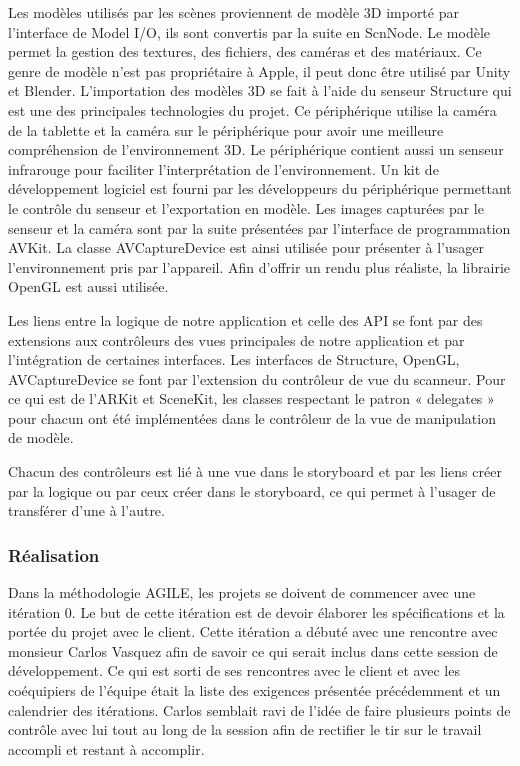 \documentclass[rapport.tex]{subfiles}
\begin{document}
\par
Les modèles utilisés par les scènes proviennent de modèle 3D importé par l’interface de Model I/O, ils sont convertis par la suite en ScnNode. Le modèle permet la gestion des textures, des fichiers, des caméras et des matériaux.\citep*{modelIODoc} Ce genre de modèle n’est pas propriétaire à Apple, il peut donc être utilisé par Unity\citep*{unityDoc} et Blender\citep*{blenderForumsRichardMarklew}.
L’importation des modèles 3D se fait à l’aide du senseur Structure qui est une des principales technologies du projet. Ce périphérique utilise la caméra de la tablette et la caméra sur le périphérique pour avoir une meilleure compréhension de l’environnement 3D. Le périphérique contient aussi un senseur infrarouge pour faciliter l’interprétation de l’environnement. Un kit de développement logiciel est fourni par les développeurs du périphérique permettant le contrôle du senseur et l’exportation en modèle.\citep{occipitalsdk} Les images capturées par le senseur et la caméra sont par la suite présentées par l’interface de programmation AVKit. La classe AVCaptureDevice est ainsi utilisée pour présenter à l’usager l’environnement pris par l’appareil.\citep*{aVKitDoc} Afin d’offrir un rendu plus réaliste, la librairie OpenGL est aussi utilisée.\citep*{openGLESDoc}
\par
Les liens entre la logique de notre application et celle des API se font par des extensions aux contrôleurs des vues principales de notre application et par l’intégration de certaines interfaces. Les interfaces de Structure, OpenGL, AVCaptureDevice se font par l’extension du contrôleur de vue du scanneur. Pour ce qui est de l’ARKit et SceneKit, les classes respectant le patron « delegates » pour chacun ont été implémentées dans le contrôleur de la vue de manipulation de modèle.
\par
Chacun des contrôleurs est lié à une vue dans le storyboard et par les liens créer par la logique ou par ceux créer dans le storyboard, ce qui permet à l’usager de transférer d’une à l’autre.
\subsubsection*{Réalisation}
Dans la méthodologie AGILE, les projets se doivent de commencer avec une itération 0. Le but de cette itération est de devoir élaborer les spécifications et la portée du projet avec le client. Cette itération a débuté avec une rencontre avec monsieur Carlos Vasquez afin de savoir ce qui serait inclus dans cette session de développement. Ce qui est sorti de ses rencontres avec le client et avec les coéquipiers de l’équipe était la liste des exigences présentée précédemment et un calendrier des itérations. Carlos semblait ravi de l’idée de faire plusieurs points de contrôle avec lui tout au long de la session afin de rectifier le tir sur le travail accompli et restant à accomplir.
\newpage
\end{document}
